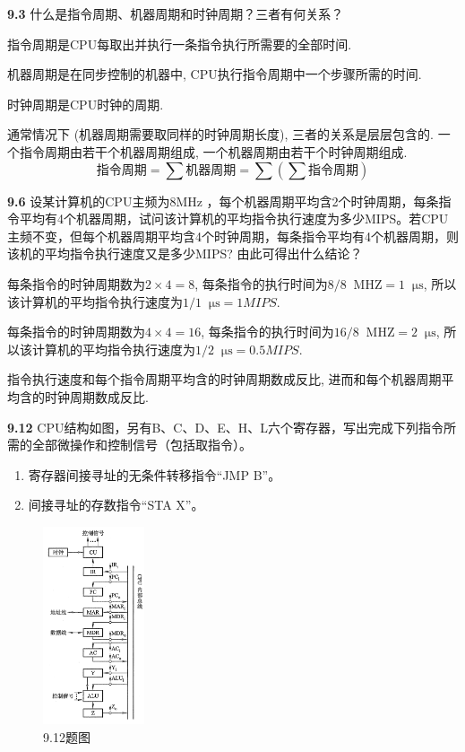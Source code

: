 \documentclass[UTF8]{report}
\newcommand*{\unit}[1]{\mathop{}\!\mathrm{#1}}
\newcommand{\problem}[1]{{\setlength{\parskip}{10pt}\noindent \bf{#1}}}
\newenvironment{solution}{{\noindent\hskip 2em \bf 解 \quad}}{}
\begin{document}
\problem{9.3} 什么是指令周期、机器周期和时钟周期？三者有何关系？

\begin{solution}
    指令周期是CPU每取出并执行一条指令执行所需要的全部时间.
    
    机器周期是在同步控制的机器中, CPU执行指令周期中一个步骤所需的时间.
    
    时钟周期是CPU时钟的周期.
    
    通常情况下 (机器周期需要取同样的时钟周期长度), 三者的关系是层层包含的. 一个指令周期由若干个机器周期组成, 一个机器周期由若干个时钟周期组成.
    \[
        \text{指令周期} = \sum \text{机器周期} = \sum\left(\sum\text{指令周期}\right)
    \]
\end{solution}


\problem{9.6} 设某计算机的CPU主频为8MHz ，每个机器周期平均含2个时钟周期，每条指令平均有4个机器周期，试问该计算机的平均指令执行速度为多少MIPS。若CPU主频不变，但每个机器周期平均含4个时钟周期，每条指令平均有4个机器周期，则该机的平均指令执行速度又是多少MIPS? 由此可得出什么结论？

\begin{solution}
    每条指令的时钟周期数为$2 \times 4 = 8 $, 每条指令的执行时间为$8 / 8 \unit{MHZ} = 1 \unit{\mu s}$, 所以该计算机的平均指令执行速度为$1 / 1 \unit{\mu s} = 1MIPS$.

    每条指令的时钟周期数为$4 \times 4 = 16$, 每条指令的执行时间为$16/ 8 \unit{MHZ} = 2 \unit{\mu s}$, 所以该计算机的平均指令执行速度为$1 / 2 \unit{\mu s} = 0.5MIPS$.

    指令执行速度和每个指令周期平均含的时钟周期数成反比, 进而和每个机器周期平均含的时钟周期数成反比.
\end{solution}


\problem{9.12} CPU结构如图，另有B、C、D、E、H、L六个寄存器，写出完成下列指令所需的全部微操作和控制信号（包括取指令）。
\begin{enumerate}[label=(\arabic*)]
    \item 寄存器间接寻址的无条件转移指令``JMP \@ B''。
    \item 间接寻址的存数指令``STA \@ X''。
\end{enumerate}
\begin{figure}[!htbp]
    \centering
    \includegraphics[width=3cm]{fig/9.12.png}
    \caption{9.12题图}
    \label{fig:9_12}
\end{figure}
\end{document}

